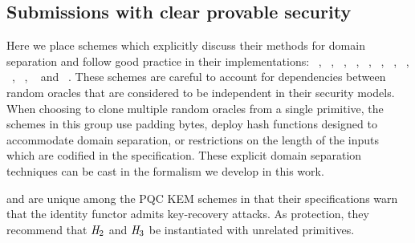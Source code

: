 \subsection{Submissions with clear provable security}
Here we place schemes which explicitly discuss their methods for domain separation and follow good practice in their implementations:
~\cite{nistpqc:ClassicMcEliece},
~\cite{nistpqc:CRYSTALSKyber},
~\cite{nistpqc:EMBLEM},
~\cite{nistpqc:FrodoKEM},
~\cite{nistpqc:HQC},
~\cite{nistpqc:LIMA},
~\cite{nistpqc:NTRU-HRSS-KEM},
~\cite{nistpqc:NTRUPrime},
~\cite{nistpqc:NTS-KEM},
~\cite{nistpqc:RQC},
~\cite{nistpqc:SIKE} and
~\cite{nistpqc:ThreeBears}.
These schemes are careful to account for dependencies between random oracles that are considered to be independent in their security models.
When choosing to clone multiple random oracles from a single primitive, the schemes in this group use padding bytes, deploy hash functions designed to accommodate domain separation, or restrictions on the length of the inputs which are codified in the specification.
These explicit domain separation techniques can be cast in the formalism we develop in this work.

 and 
are unique among the PQC KEM schemes in that their specifications warn that the identity functor admits key-recovery attacks. As protection, they recommend that $\mathit{H}_2$ and $\mathit{H}_3$ be instantiated with unrelated primitives. %

